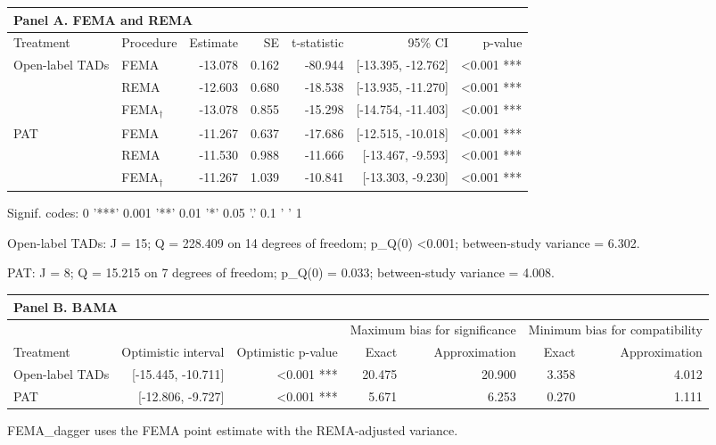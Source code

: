 \begin{table}[htbp]
\centering
\small
\begin{tabular}{llrrrrr}
\multicolumn{7}{l}{\textbf{Panel A. FEMA and REMA}}\\
\toprule
Treatment & Procedure & Estimate & SE & t-statistic & 95\% CI & p-value \\
\midrule
Open-label TADs & FEMA & -13.078 & 0.162 & -80.944 & [-13.395, -12.762] & \textless{}0.001 *** \\
 & REMA & -12.603 & 0.680 & -18.538 & [-13.935, -11.270] & \textless{}0.001 *** \\
 & FEMA$_\dagger$ & -13.078 & 0.855 & -15.298 & [-14.754, -11.403] & \textless{}0.001 *** \\
\addlinespace
PAT & FEMA & -11.267 & 0.637 & -17.686 & [-12.515, -10.018] & \textless{}0.001 *** \\
 & REMA & -11.530 & 0.988 & -11.666 & [-13.467, -9.593] & \textless{}0.001 *** \\
 & FEMA$_\dagger$ & -11.267 & 1.039 & -10.841 & [-13.303, -9.230] & \textless{}0.001 *** \\
\bottomrule
\end{tabular}
\par\smallskip
{\footnotesize\raggedright Signif. codes:  0 '***' 0.001 '**' 0.01 '*' 0.05 '.' 0.1 ' ' 1\par}
{\footnotesize\raggedright Open-label TADs: J = 15; Q = 228.409 on 14 degrees of freedom; p\_Q(0) \textless{}0.001; between-study variance = 6.302.\par}
{\footnotesize\raggedright PAT: J = 8; Q = 15.215 on 7 degrees of freedom; p\_Q(0) = 0.033; between-study variance = 4.008.\par}
\vspace{0.75em}
\setlength{\tabcolsep}{5pt}
\begin{tabular}{lrrrrrr}
\multicolumn{7}{l}{\textbf{Panel B. BAMA}}\\
\toprule
 & & & \multicolumn{2}{c}{Maximum bias for significance} & \multicolumn{2}{c}{Minimum bias for compatibility}\\
\cmidrule(lr){4-5}\cmidrule(l){6-7}
Treatment & Optimistic interval & Optimistic p-value & Exact & Approximation & Exact & Approximation \\
\midrule
Open-label TADs & [-15.445, -10.711] & \textless{}0.001 *** & 20.475 & 20.900 & 3.358 & 4.012 \\
PAT & [-12.806, -9.727] & \textless{}0.001 *** & 5.671 & 6.253 & 0.270 & 1.111 \\
\bottomrule
\end{tabular}
\par\smallskip
{\footnotesize\raggedright FEMA\_dagger uses the FEMA point estimate with the REMA-adjusted variance.\par}
\end{table}
